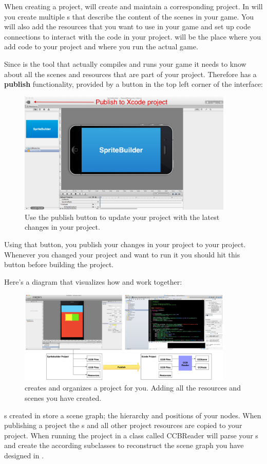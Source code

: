 When creating a \SB{} project, \SB{} will create and maintain a corresponding
\xcode{} project. In \SB{} will you create multiple \ccbfile{}s that describe
the content of the scenes in your game. You will also add the resources that
you want to use in your game and set up code connections to interact with the
code in your \xcode{} project. \xcode{} will be the place where you add code to
your project and where you run the actual game.

Since \xcode{} is the tool that actually compiles and runs your game it needs
to know about all the scenes and resources that are part of your \SB{} project.
Therefore \SB{} has a \textbf{publish} functionality, provided by a button in
the top left corner of the interface:
\begin{figure}[H]
		\centering
		\includegraphics[width=290pt]{images/spritebuilder/spritebuilder_publish_button.png}
		\caption{Use the publish button to update your \xcode{} project with the
		latest changes in your \SB{} project.}
\end{figure}
Using that button, you publish your changes in your
\SB{} project to your \xcode{} project. Whenever you changed your \SB{}
project and want to run it you should hit this button before building the \xcode{}
project.

Here's a diagram that visualizes how \SB{} and \xcode{} work together:
\begin{figure}[H]
		\centering
		\includegraphics[width=290pt]{images/spritebuilder/spritebuilder_publishing.png}
		\caption{\SB{} creates and organizes a \xcode{} project for you. Adding
		all the resources and scenes you have created.}
\end{figure}
\ccbfile{}s created in \SB{} store a scene graph; the hierarchy and positions of
your nodes. When publishing a \SB{} project the \ccbfile{}s and all other
project resources are copied to your \xcode{} project.
When running the project in \xcode{} a class called CCBReader will parse your
\ccbfile{}s and create the according \ccnode{} subclasses to reconstruct the scene
graph you have designed in \spriteb{}.

